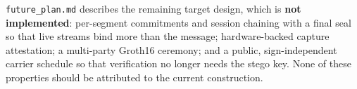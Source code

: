 \documentclass[11pt,a4paper]{article}
\theoremstyle{definition}
\theoremstyle{remark}
\begin{document}
\texttt{future\_plan.md} describes the remaining target design, which is
\textbf{not implemented}: per-segment commitments and session chaining with a
final seal so that live streams bind more than the message; hardware-backed
capture attestation; a multi-party Groth16 ceremony; and a public,
sign-independent carrier schedule so that verification no longer needs the
stego key. None of these properties should be attributed to the current
construction.
\end{document}
